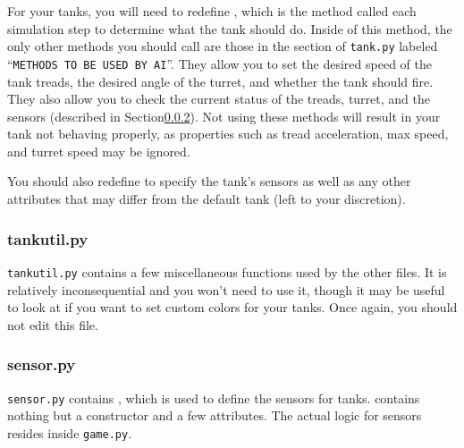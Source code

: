 \documentclass[11pt]{cselabheader}
\begin{document}
For your tanks, you will need to redefine
, which is the method called each simulation step
to determine what the tank should do. Inside of this method, the only other
methods you should call are those in the section of \texttt{tank.py} labeled
``\texttt{METHODS TO BE USED BY AI}''. They allow you to set the desired speed
of the tank treads, the desired angle of the turret, and whether the tank should
fire. They also allow you to check the current status of the treads, turret, and
the sensors (described in Section\ref{subsubsec:sensor}). Not using these
methods will result in your tank not behaving properly, as properties such as
tread acceleration, max speed, and turret speed may be ignored.

You should also redefine  to specify the tank's sensors as
well as any other attributes that may differ from the default tank (left to your
discretion).

\subsubsection{tankutil.py}
\texttt{tankutil.py} contains a few miscellaneous functions used by the other
files. It is relatively inconsequential and you won't need to use it, though it
may be useful to look at if you want to set custom colors for your tanks. Once
again, you should not edit this file.

\subsubsection{sensor.py}
\label{subsubsec:sensor}
\texttt{sensor.py} contains , which is used to define
the sensors for tanks.  contains nothing but a constructor
and a few attributes. The actual logic for sensors resides inside
\texttt{game.py}.
\end{document}
